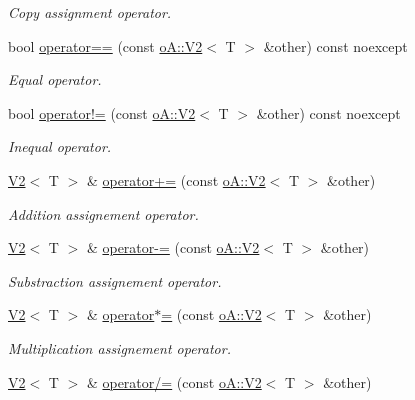 \begin{DoxyCompactItemize}
\begin{DoxyCompactList}\small\item\em Copy assignment operator. \end{DoxyCompactList}\item 
bool \mbox{\hyperlink{structo_a_1_1_v2_a7f3c992b4271b76c704b30a42801facb}{operator==}} (const \mbox{\hyperlink{structo_a_1_1_v2}{o\+A\+::\+V2}}$<$ T $>$ \&other) const noexcept
\begin{DoxyCompactList}\small\item\em Equal operator. \end{DoxyCompactList}\item 
bool \mbox{\hyperlink{structo_a_1_1_v2_a5ca601a9f46507dba0e6a78e4e6fb06e}{operator!=}} (const \mbox{\hyperlink{structo_a_1_1_v2}{o\+A\+::\+V2}}$<$ T $>$ \&other) const noexcept
\begin{DoxyCompactList}\small\item\em Inequal operator. \end{DoxyCompactList}\item 
\mbox{\hyperlink{structo_a_1_1_v2}{V2}}$<$ T $>$ \& \mbox{\hyperlink{structo_a_1_1_v2_ab5f783ae5cda46636a17dda5bc552a13}{operator+=}} (const \mbox{\hyperlink{structo_a_1_1_v2}{o\+A\+::\+V2}}$<$ T $>$ \&other)
\begin{DoxyCompactList}\small\item\em Addition assignement operator. \end{DoxyCompactList}\item 
\mbox{\hyperlink{structo_a_1_1_v2}{V2}}$<$ T $>$ \& \mbox{\hyperlink{structo_a_1_1_v2_a6e33681639974e51d66db212b7fcddbc}{operator-\/=}} (const \mbox{\hyperlink{structo_a_1_1_v2}{o\+A\+::\+V2}}$<$ T $>$ \&other)
\begin{DoxyCompactList}\small\item\em Substraction assignement operator. \end{DoxyCompactList}\item 
\mbox{\hyperlink{structo_a_1_1_v2}{V2}}$<$ T $>$ \& \mbox{\hyperlink{structo_a_1_1_v2_ae618eb05f845b5a4219d198e33f79699}{operator$\ast$=}} (const \mbox{\hyperlink{structo_a_1_1_v2}{o\+A\+::\+V2}}$<$ T $>$ \&other)
\begin{DoxyCompactList}\small\item\em Multiplication assignement operator. \end{DoxyCompactList}\item 
\mbox{\hyperlink{structo_a_1_1_v2}{V2}}$<$ T $>$ \& \mbox{\hyperlink{structo_a_1_1_v2_a9305c1fafa282470c0670119733f346c}{operator/=}} (const \mbox{\hyperlink{structo_a_1_1_v2}{o\+A\+::\+V2}}$<$ T $>$ \&other)

\end{DoxyCompactItemize}

